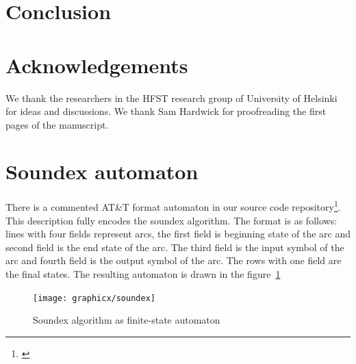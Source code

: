 \documentclass[a4paper,12pt]{article}
\begin{document}
\section{Conclusion}
\label{sec:conclusion}

\section*{Acknowledgements}

We thank the researchers in the HFST research group of University of Helsinki
for ideas and discussions. We thank Sam Hardwick for proofreading the first
pages of the manuscript.



\section*{Soundex automaton}
\label{appendix:soundex}

There is a commented AT\&T format automaton in our source code
repository\footnote{\url{}}. This description fully encodes the soundex
algorithm.  The format is as follows: lines with four fields represent arcs,
the first field is beginning state of the arc and second field is the end state
of the arc. The third field is the input symbol of the arc and fourth field is
the output symbol of the arc. The rows with one field are the final states. The
resulting automaton is drawn in the figure~\ref{fig:soundex}

\begin{figure}
    \centering
    \texttt{[image: graphicx/soundex]}
    \caption{Soundex algorithm as finite-state automaton
    \label{fig:soundex}}
\end{figure}
\end{document}
